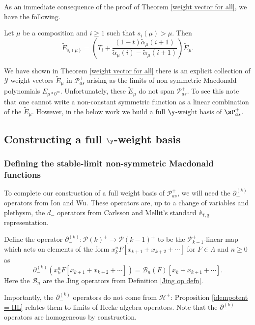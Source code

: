 As an immediate consequence of the proof of Theorem \ref{weight vector for all}, we have the following. 

\begin{coro}\label{action of T on E mu}
    Let $\mu$ be a composition and $i \geq 1$ such that $s_i(\mu) > \mu$. Then 
    $$\widetilde{E}_{s_i(\mu)} = \left(T_i + \frac{(1-t)\widetilde{\alpha}_{\mu}(i+1)}{\widetilde{\alpha}_{\mu}(i) - \widetilde{\alpha}_{\mu}(i+1)}\right) \widetilde{E}_{\mu}.$$
\end{coro}

We have shown in Theorem \ref{weight vector for all} there is an explicit collection of $\mathscr{Y}$-weight vectors $\widetilde{E}_{\mu}$ in $\mathscr{P}_{as}^{+}$ arising as the limits of non-symmetric Macdonald polynomials $E_{\mu * 0^m}$. Unfortunately, these $\widetilde{E}_{\mu}$ do not span $\mathscr{P}_{as}^{+}$. To see this note that one cannot write a non-constant symmetric function as a linear combination of the $\widetilde{E}_{\mu}$. However, in the below work we build a full $\y$-weight basis of $\sP_{as}^{+}$. 

\subsection{Constructing a full \texorpdfstring{$\y$}{Y}-weight basis}

\subsubsection{Defining the stable-limit non-symmetric Macdonald functions}
 To complete our construction of a full weight basis of $\mathscr{P}_{as}^{+}$, we will need the $\partial_{-}^{(k)}$ operators from Ion and Wu. These operators are, up to a change of variables and plethysm, the $d_{-}$ operators from Carlsson and Mellit's standard $\mathbb{A}_{t,q}$ representation. 

\begin{defi} \label{defn7}
 Define the operator $\partial_{-}^{(k)}: \mathscr{P}(k)^{+} \rightarrow \mathscr{P}(k-1)^{+}$ to be the $\mathscr{P}_{k-1}^{+}$-linear map which acts on elements of the form $x_k^nF[x_{k+1}+x_{k+2}+ \cdots]$ for $F \in \Lambda$ and $n \geq 0$ as 
 $$\partial_{-}^{(k)}(x_k^nF[x_{k+1}+x_{k+2}+ \cdots]) = \mathscr{B}_n(F)[x_k + x_{k+1} + \cdots]. $$
 Here the $\mathscr{B}_n$ are the Jing operators from Definition \ref{Jing op defn}.
 
\end{defi}
 Importantly, the $\partial_{-}^{(k)}$ operators do not come from $\mathscr{H}^{+}$: Proposition \ref{idempotent = HL} relates them to limits of Hecke algebra operators. Note that the $\partial_{-}^{(k)}$ operators are homogeneous by construction. 

